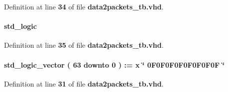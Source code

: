 Definition at line {\bf 34} of file {\bf data2packets\+\_\+tb.\+vhd}.

\paragraph[{dut0\+\_\+pct\+\_\+data\+\_\+wrreq\+\_\+delay}]{ {\bfseries \textcolor{comment}{std\+\_\+logic}\textcolor{vhdlchar}{ }} \hspace{0.3cm}{\ttfamily [Signal]}}\label{classdata2packets__tb_1_1tb__behave_acd2f7f7ae26ef31f91a4eec4428db32d}


Definition at line {\bf 35} of file {\bf data2packets\+\_\+tb.\+vhd}.

\paragraph[{dut0\+\_\+pct\+\_\+hdr\+\_\+0}]{ {\bfseries \textcolor{comment}{std\+\_\+logic\+\_\+vector}\textcolor{vhdlchar}{ }\textcolor{vhdlchar}{(}\textcolor{vhdlchar}{ }\textcolor{vhdlchar}{ } \textcolor{vhdldigit}{63} \textcolor{vhdlchar}{ }\textcolor{keywordflow}{downto}\textcolor{vhdlchar}{ }\textcolor{vhdlchar}{ } \textcolor{vhdldigit}{0} \textcolor{vhdlchar}{ }\textcolor{vhdlchar}{)}\textcolor{vhdlchar}{ }\textcolor{vhdlchar}{ }\textcolor{vhdlchar}{ }\textcolor{vhdlchar}{\+:}\textcolor{vhdlchar}{=}\textcolor{vhdlchar}{ }\textcolor{vhdlchar}{ }\textcolor{vhdlchar}{x}\textcolor{vhdlchar}{ }\textcolor{keyword}{\char`\"{} 0\+F0\+F0\+F0\+F0\+F0\+F0\+F0\+F \char`\"{}}\textcolor{vhdlchar}{ }} \hspace{0.3cm}{\ttfamily [Signal]}}\label{classdata2packets__tb_1_1tb__behave_ae1cf693382b94e0440e86c7d0712f564}


Definition at line {\bf 31} of file {\bf data2packets\+\_\+tb.\+vhd}.

